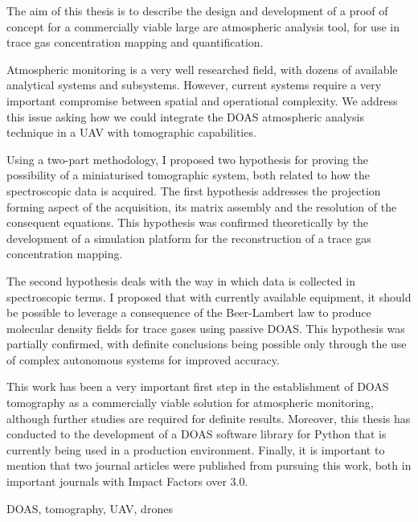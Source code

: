 

The aim of this thesis is to describe the design and development of a
proof of concept for a commercially viable large are atmospheric
analysis tool, for use in trace gas concentration mapping and
quantification. 

Atmospheric monitoring is a very well researched field, with dozens of
available analytical systems and subsystems. However, current systems
require a very important compromise between spatial and operational
complexity. We address this issue asking how we could integrate the
\gls{DOAS} atmospheric analysis technique in a \gls{UAV} with
tomographic capabilities.

Using a two-part methodology, I proposed two hypothesis for proving the
possibility of a miniaturised tomographic system, both related to how
the spectroscopic data is acquired. The first hypothesis addresses the
projection forming aspect of the acquisition, its matrix assembly and
the resolution of the consequent equations. This hypothesis was
confirmed theoretically by the development of a simulation platform for
the reconstruction of a trace gas concentration mapping.

The second hypothesis deals with the way in which data is collected in
spectroscopic terms. I proposed that with currently available equipment,
it should be possible to leverage a consequence of the Beer-Lambert law
to produce molecular density fields for trace gases using passive
\gls{DOAS}. This hypothesis was partially confirmed, with definite
conclusions being possible only through the use of complex autonomous
systems for improved accuracy.

This work has been a very important first step in the establishment of
\gls{DOAS} tomography as a commercially viable solution for atmospheric
monitoring, although further studies are required for definite results.
Moreover, this thesis has conducted to the development of a \gls{DOAS}
software library for Python that is currently being used in a production
environment. Finally, it is important to mention that two journal
articles were published from pursuing this work, both in important
journals with Impact Factors over 3.0.


\begin{keywords}
    \gls{DOAS}, tomography, \gls{UAV}, drones
\end{keywords} 
